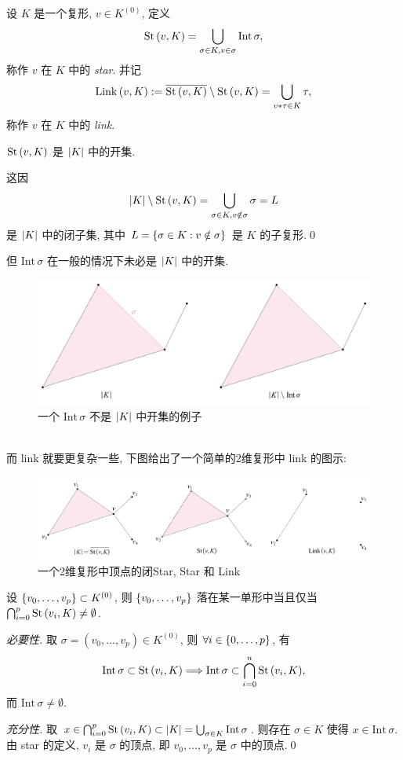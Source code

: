 \begin{Definition}
	设 $ K $ 是一个复形, $ v\in K^{(0)} $, 定义
	\[
		\mathrm{St}\,(v,K)=\bigcup_{\sigma\in K,v\in\sigma}\mathrm{Int}\,\sigma,
	\]
	称作 $ v $ 在 $ K $ 中的 \emph{star}. 并记
	\[
		\mathrm{Link}\,(v,K):=\overline{\mathrm{St}\,(v,K)}\setminus\mathrm{St}\,(v,K)=\bigcup_{v*\tau\in K}\tau,
	\]
	称作 $ v $ 在 $ K $ 中的 \emph{link}.
\end{Definition}

\begin{Proposition}
	$ \mathrm{St}\,(v,K) $ 是 $ \left| K \right|  $ 中的开集.
\end{Proposition}
\begin{Proof}
	这因
	\[
		\left| K \right| \setminus\mathrm{St}\,(v,K)=\bigcup_{\sigma\in K,v\notin\sigma}\sigma=L
	\]
	是 $ \left| K \right|  $ 中的闭子集, 其中 $ L=\left\{ \sigma\in K : v\notin\sigma \right\} $ 是 $ K $ 的子复形.\qed
\end{Proof}

但 $ \mathrm{Int}\,\sigma $ 在一般的情况下未必是 $ \left| K \right|  $ 中的开集.
\begin{figure}[htbp]
	\centering
	\includegraphics[width=0.6\linewidth]{figures/Sec5-2.png}
	\caption{一个 $ \mathrm{Int}\,\sigma $ 不是 $ \left| K \right|  $ 中开集的例子}
\end{figure}~\\
而 link 就要更复杂一些, 下图给出了一个简单的2维复形中 link 的图示:
\begin{figure}[htbp]
	\centering
	\includegraphics[width=0.8\linewidth]{figures/Sec5-3.png}
	\caption{一个2维复形中顶点的闭Star, Star 和 Link}
\end{figure}

\begin{Proposition}\label{prop:5.5}
	设 $ \left\{ v_0,\dots,v_p \right\}\subset K^{(0)} $, 则 $ \left\{ v_0,\dots,v_p \right\} $ 落在某一单形中当且仅当 $ \bigcap_{i=0}^p\mathrm{St}\,(v_i,K)\ne\emptyset $.
\end{Proposition}
\begin{Proof}
	\textit{必要性.} 取 $ \sigma=(v_0,\dots,v_p)\in K^{(0)} $, 则 $ \forall i\in\left\{ 0,\dots,p \right\} $, 有
	\[
		\mathrm{Int}\,\sigma\subset\mathrm{St}\,(v_i,K)\Longrightarrow \mathrm{Int}\,\sigma\subset\bigcap_{i=0}^n\mathrm{St}\,(v_i,K),
	\]
	而 $ \mathrm{Int}\,\sigma\ne\emptyset $.

	\textit{充分性.} 取 $ x\in\bigcap_{i=0}^p\mathrm{St}\,(v_i,K)\subset \left| K \right| =\bigcup_{\sigma\in K}\mathrm{Int}\,\sigma $. 则存在 $ \sigma\in K $ 使得 $ x\in\mathrm{Int}\,\sigma $. 由 star 的定义, $ v_i $ 是 $ \sigma $ 的顶点, 即 $ v_0,\dots,v_p $ 是 $ \sigma $ 中的顶点.\qed
\end{Proof}


